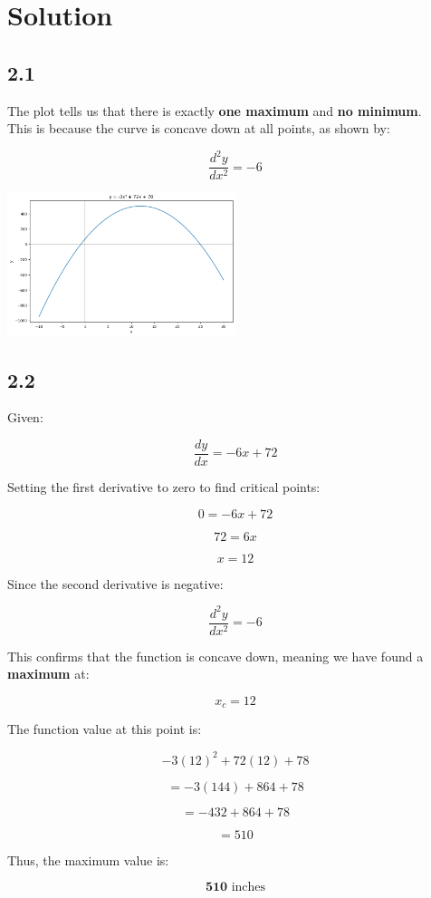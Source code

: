 \documentclass{../harvardml}
\theoremstyle{definition}
\theoremstyle{plain}
\newenvironment{solution}
  {\color{blue}\section*{Solution}}
{}
\begin{document}
\newpage


\begin{solution}
	
\subsection*{2.1}
The plot tells us that there is exactly \textbf{one maximum} and \textbf{no minimum}. \\
This is because the curve is concave down at all points, as shown by:

\[
\frac{d^2y}{dx^2} = -6
\]

\begin{center}
\includegraphics[width=0.5\textwidth]{images/2.1.png}
\end{center}

\subsection*{2.2}
Given:

\[
\frac{dy}{dx} = -6x + 72
\]

Setting the first derivative to zero to find critical points:

\[
0 = -6x + 72
\]

\[
72 = 6x
\]

\[
x = 12
\]

Since the second derivative is negative:

\[
\frac{d^2y}{dx^2} = -6
\]

This confirms that the function is concave down, meaning we have found a \textbf{maximum} at:

\[
x_c = 12
\]

The function value at this point is:

\[
-3(12)^2 + 72(12) + 78
\]

\[
= -3(144) + 864 + 78
\]

\[
= -432 + 864 + 78
\]

\[
= 510
\]

Thus, the maximum value is:

\[
\mathbf{510} \text{ inches}
\]


\end{solution}
\end{document}
